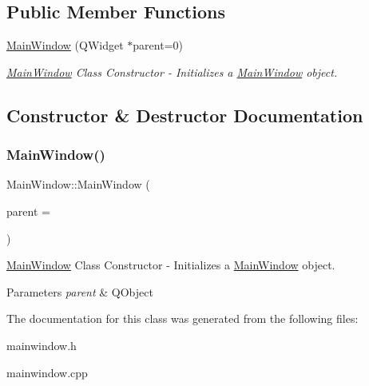 \subsection*{Public Member Functions}
\begin{DoxyCompactItemize}
\item 
\hyperlink{class_main_window_a8b244be8b7b7db1b08de2a2acb9409db}{Main\+Window} (Q\+Widget $\ast$parent=0)
\begin{DoxyCompactList}\small\item\em \hyperlink{class_main_window}{Main\+Window} Class Constructor -\/ Initializes a \hyperlink{class_main_window}{Main\+Window} object. \end{DoxyCompactList}\end{DoxyCompactItemize}


\subsection{Constructor \& Destructor Documentation}
\mbox{\label{class_main_window_a8b244be8b7b7db1b08de2a2acb9409db}} 
\subsubsection{\texorpdfstring{Main\+Window()}{MainWindow()}}
{\footnotesize\ttfamily Main\+Window\+::\+Main\+Window (\begin{DoxyParamCaption}\item[{Q\+Widget $\ast$}]{parent = {} }\end{DoxyParamCaption})\hspace{0.3cm}{\ttfamily [explicit]}}



\hyperlink{class_main_window}{Main\+Window} Class Constructor -\/ Initializes a \hyperlink{class_main_window}{Main\+Window} object. 


\begin{DoxyParams}{Parameters}
{\em parent} & Q\+Object \\
\hline
\end{DoxyParams}


The documentation for this class was generated from the following files\+:\begin{DoxyCompactItemize}
\item 
mainwindow.\+h\item 
mainwindow.\+cpp\end{DoxyCompactItemize}
